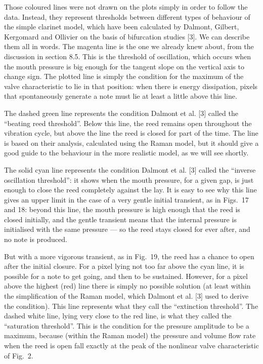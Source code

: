 

  Those coloured lines were not drawn on the plots simply in order to follow 
  the data. Instead, they represent thresholds between different types of 
  behaviour of the simple clarinet model, which have been calculated by 
  Dalmont, Gilbert, Kergomard and Ollivier on the basis of bifurcation studies 
  [3]. We can describe them all in words. The magenta line is the one we 
  already knew about, from the discussion in section 8.5. This is the threshold 
  of oscillation, which occurs when the mouth pressure is big enough for the 
  tangent slope on the vertical axis to change sign. The plotted line is simply 
  the condition for the maximum of the valve characteristic to lie in that 
  position: when there is energy dissipation, pixels that spontaneously 
  generate a note must lie at least a little above this line. 

  The dashed green line represents the condition Dalmont et al. [3] called the 
  “beating reed threshold”. Below this line, the reed remains open throughout 
  the vibration cycle, but above the line the reed is closed for part of the 
  time. The line is based on their analysis, calculated using the Raman model, 
  but it should give a good guide to the behaviour in the more realistic model, 
  as we will see shortly. 

  The solid cyan line represents the condition Dalmont et al. [3] called the 
  “inverse oscillation threshold”: it shows when the mouth pressure, for a 
  given gap, is just enough to close the reed completely against the lay. It is 
  easy to see why this line gives an upper limit in the case of a very gentle 
  initial transient, as in Figs.\ 17 and 18: beyond this line, the mouth 
  pressure is high enough that the reed is closed initially, and the gentle 
  transient means that the internal pressure is initialised with the same 
  pressure — so the reed stays closed for ever after, and no note is produced. 

  But with a more vigorous transient, as in Fig.\ 19, the reed has a chance to 
  open after the initial closure. For a pixel lying not too far above the cyan 
  line, it is possible for a note to get going, and then to be sustained. 
  However, for a pixel above the highest (red) line there is simply no possible 
  solution (at least within the simplification of the Raman model, which 
  Dalmont et al. [3] used to derive the condition). This line represents what 
  they call the “extinction threshold”. The dashed white line, lying very close 
  to the red line, is what they called the ``saturation threshold''. This is 
  the condition for the pressure amplitude to be a maximum, because (within the 
  Raman model) the pressure and volume flow rate when the reed is open fall 
  exactly at the peak of the nonlinear valve characteristic of Fig.\ 2. 

